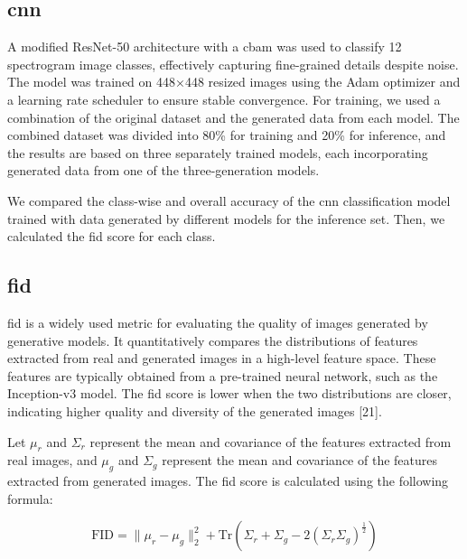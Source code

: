 \subsection{\gls{cnn}}
A modified ResNet-50 architecture with a \gls{cbam} was used to classify 12 spectrogram image classes, effectively capturing fine-grained details despite noise. The model was trained on 448×448 resized images using the Adam optimizer and a learning rate scheduler to ensure stable convergence. For training, we used a combination of the original dataset and the generated data from each model. The combined dataset was divided into 80\% for training and 20\% for inference, and the results are based on three separately trained models, each incorporating generated data from one of the three-generation models.

We compared the class-wise and overall accuracy of the \gls{cnn} classification model trained with data generated by different models for the inference set. Then, we calculated the \gls{fid} score for each class. 

\subsection{\gls{fid}}
\gls{fid} is a widely used metric for evaluating the quality of images generated by generative models. It quantitatively compares the distributions of features extracted from real and generated images in a high-level feature space. These features are typically obtained from a pre-trained neural network, such as the Inception-v3 model. The \gls{fid} score is lower when the two distributions are closer, indicating higher quality and diversity of the generated images [21].

Let $\mu_r$ and $\Sigma_r$ represent the mean and covariance of the features extracted from real images, and $\mu_g$ and $\Sigma_g$ represent the mean and covariance of the features extracted from generated images. The \gls{fid} score is calculated using the following formula:

\begin{equation}
\text{FID} = \|\mu_r - \mu_g\|_2^2 + \text{Tr}(\Sigma_r + \Sigma_g - 2 (\Sigma_r \Sigma_g)^{\frac{1}{2}})
\end{equation}

